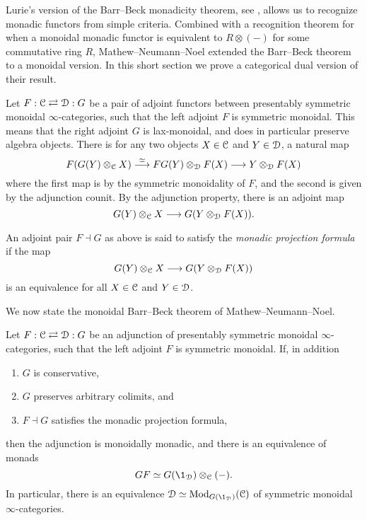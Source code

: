 Lurie's version of the Barr--Beck monadicity theorem, see \cite[Section 4.7]{Lurie_HA}, allows us to recognize monadic functors from simple criteria. Combined with a recognition theorem for when a monoidal monadic functor is equivalent to $R\otimes(-)$ for some commutative ring $R$, Mathew--Neumann--Noel extended the Barr--Beck theorem to a monoidal version. In this short section we prove a categorical dual version of their result. 

Let $F:\EuScript{C}\rightleftarrows \EuScript{D}:G$ be a pair of adjoint functors between presentably symmetric monoidal $\infty$-categories, such that the left adjoint $F$ is symmetric monoidal. This means that the right adjoint $G$ is lax-monoidal, and does in particular preserve algebra objects. There is for any two objects $X\in \EuScript{C}$ and $Y\in \EuScript{D}$, a natural map
\[F(G(Y)\otimes_{\EuScript{C}} X)\overset{\simeq}{\longrightarrow} FG(Y)\otimes_{\EuScript{D}} F(X) \longrightarrow Y\otimes_{\EuScript{D}} F(X)\]
where the first map is by the symmetric monoidality of $F$, and the second is given by the adjunction counit. By the adjunction property, there is an adjoint map 
\[G(Y)\otimes_{\EuScript{C}} X \longrightarrow G(Y\otimes_{\EuScript{D}} F(X)).\]

\begin{definition}
    An adjoint pair $F\dashv G$ as above is said to satisfy the \emph{monadic projection formula} if the map 
    \[G(Y)\otimes_{\EuScript{C}} X \longrightarrow G(Y\otimes_{\EuScript{D}} F(X))\]
    is an equivalence for all $X\in \EuScript{C}$ and $Y\in \EuScript{D}$. 
\end{definition}

We now state the monoidal Barr--Beck theorem of Mathew--Neumann--Noel. 

\begin{theorem}
    \label{ch2:thm:monoidal-BB}
    Let $F:\EuScript{C}\rightleftarrows \EuScript{D}:G$ be an adjunction of presentably symmetric monoidal $\infty$-categories, such that the left adjoint $F$ is symmetric monoidal. If, in addition
    \begin{enumerate}
        \item $G$ is conservative,
        \item $G$ preserves arbitrary colimits, and
        \item $F\dashv G$ satisfies the monadic projection formula,
    \end{enumerate}
    then the adjunction is monoidally monadic, and there is an equivalence of monads 
    \[GF \simeq G(\1_\D)\otimes_\C(-).\]
    In particular, there is an equivalence $\D\simeq \Mod_{G(\1_\D)}(\C)$ of symmetric monoidal $\infty$-categories. 
\end{theorem}

